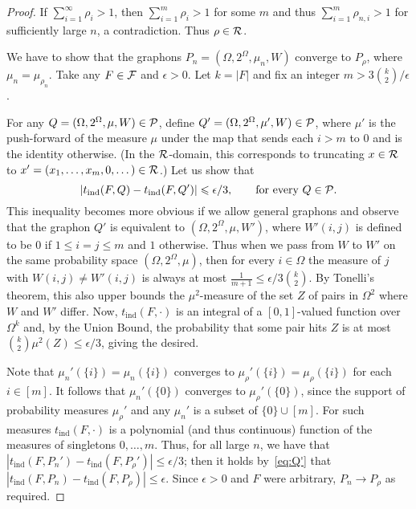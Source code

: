 \documentclass[12pt]{article}
\newcommand{\eps}{\epsilon}
\theoremstyle{definition}
\theoremstyle{remark}
\newcommand{\C}[1]{{\protect\mathcal{#1}}}
\newcommand{\tind}{t_{\mathrm{ind}}}
\newcommand{\e}{\eps}
\renewcommand{\le}{\leqslant}
\begin{document}
\begin{proof} If $\sum_{i=1}^\infty \rho_i>1$, then $\sum_{i=1}^m \rho_i>1$ for some $m$ and thus $\sum_{i=1}^m \rho_{n,i}>1$ for sufficiently large $n$, a contradiction. Thus $\rho\in\C{R}$.

We have to show that the graphons $P_n=(\Omega,2^\Omega,\mu_n,W)$ converge to $P_{\rho}$, where $\mu_n=\mu_{\rho_{n}}$. Take any $F\in\C F$ and $\e>0$. Let $k=|F|$ and fix an integer $m>3{k\choose 2}/\e$. 

For any $Q=(\Omega,2^\Omega,\mu,W)\in\C P$, define $Q'=(\Omega,2^\Omega,\mu',W)\in\C P$, where $\mu'$ is the push-forward of the measure $\mu$ under the map that sends each $i>m$ to $0$ and is the identity otherwise. (In the $\C{R}$-domain, this corresponds to truncating $x\in\C{R}$ to $x'=(x_1,\dots,x_m,0,\dots)\in\C{R}$.) Let us show that  \begin{equation}\label{eq:Q'}
 |\tind(F,Q)-\tind(F,Q')|\le \e/3,\qquad\mbox{for every $Q\in\C P$.}
 \end{equation} 
 This inequality becomes more obvious if we allow general graphons and observe that the graphon $Q'$ is equivalent to $(\Omega,2^\Omega,\mu,W')$, where $W'(i,j)$ is defined to be $0$ if $1\le i=j\le m$ and $1$ otherwise. Thus when we pass from $W$ to $W'$ on the same probability space $(\Omega,2^\Omega,\mu)$, then for every $i\in \Omega$ the measure of $j$ with $W(i,j)\not=W'(i,j)$ is always at most $\frac{1}{m+1}\le\e/3{k\choose 2}$. By Tonelli's theorem, this also upper bounds the $\mu^2$-measure of the set $Z$ of pairs in $\Omega^2$ where $W$ and $W'$ differ. Now, $\tind(F,\cdot)$ is an integral of a $[0,1]$-valued function over $\Omega^k$ and, by the Union Bound, the probability that some pair hits $Z$ is at most ${k\choose 2}\mu^2(Z)\le \e/3$, giving the desired.

Note that $\mu_n'(\{i\})=\mu_n(\{i\})$ converges to $\mu_\rho'(\{i\})=\mu_\rho(\{i\})$ for each $i\in[m]$. It follows that $\mu_n'(\{0\})$ converges to $\mu_\rho'(\{0\})$,
since the support of probability measures $\mu_\rho'$ and any $\mu_n'$ is a subset of $\{0\}\cup[m]$. For such measures $\tind(F,\cdot)$ is a polynomial (and thus continuous) function of the measures of singletons $0,\dots,m$. Thus, for all large $n$, we have that $|\tind(F,P_n')-\tind(F,P_\rho')|\le \e/3$; then it holds by~\eqref{eq:Q'} that  $|\tind(F,P_n)-\tind(F,P_\rho)|\le \e$. Since $\e>0$ and $F$ were arbitrary, $P_n\to P_\rho$ as required.\end{proof} 
\end{document}
